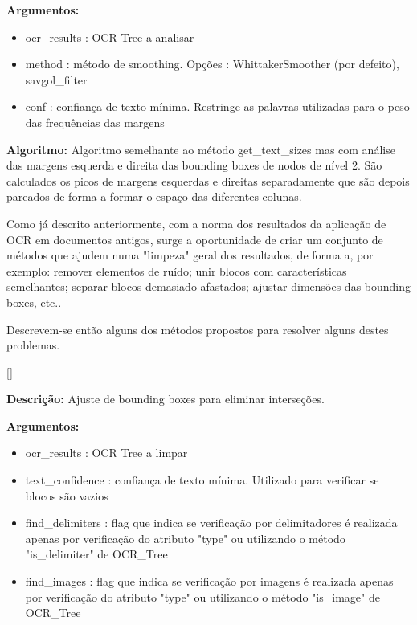 \textbf{Argumentos:}
\begin{itemize}\setlength\itemsep{-0.3em}
	\item ocr\_results : OCR Tree a analisar
	\item method : método de smoothing. Opções : WhittakerSmoother (por defeito), savgol\_filter
	\item conf : confiança de texto mínima. Restringe as palavras utilizadas para o peso das frequências das margens
\end{itemize}

\textbf{Algoritmo:} Algoritmo semelhante ao método get\_text\_sizes mas com análise das margens esquerda e direita das bounding boxes de nodos de nível 2. São calculados os picos de margens esquerdas e direitas separadamente que são depois pareados de forma a formar o espaço das diferentes colunas.



\label{contribution_clean_ocr}

Como já descrito anteriormente, com a norma dos resultados da aplicação de OCR em documentos antigos, surge a oportunidade de criar um conjunto de métodos que ajudem numa "limpeza" geral dos resultados, de forma a, por exemplo: remover elementos de ruído; unir blocos com características semelhantes; separar blocos demasiado afastados; ajustar dimensões das bounding boxes, etc..



Descrevem-se então alguns dos métodos propostos para resolver alguns destes problemas.


[\normalsize]

\textbf{Descrição:} Ajuste de bounding boxes para eliminar interseções.

\textbf{Argumentos:}
\begin{itemize}\setlength\itemsep{-0.3em}
	\item ocr\_results : OCR Tree a limpar
	\item text\_confidence : confiança de texto mínima. Utilizado para verificar se blocos são vazios
	\item find\_delimiters : flag que indica se verificação por delimitadores é realizada apenas por verificação do atributo "type" ou utilizando o método "is\_delimiter" de OCR\_Tree
	\item find\_images : flag que indica se verificação por imagens é realizada apenas por verificação do atributo "type" ou utilizando o método "is\_image" de OCR\_Tree
\end{itemize}


